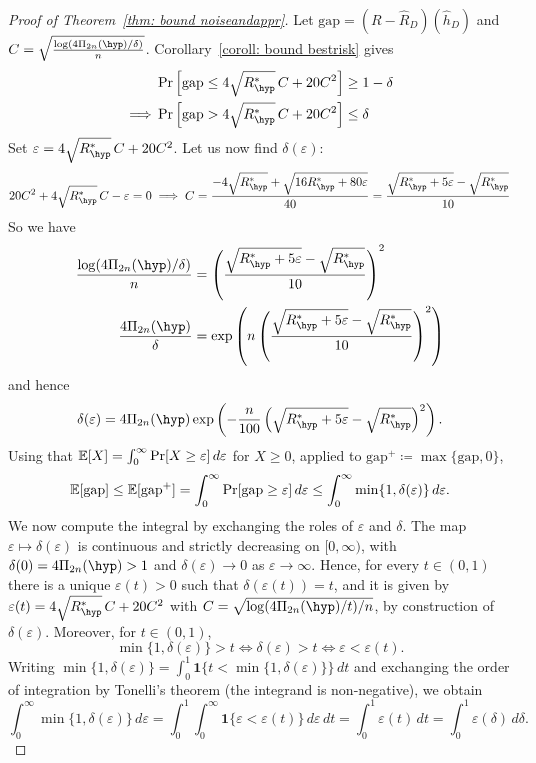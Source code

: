 \documentclass[reqno]{amsart}
\begin{document}
\begin{theorem}
\begin{proof}[Proof of Theorem~\ref{thm: bound noiseandappr}]
    Let $\text{gap} = (R-\hat R_D)(\hat h_D)$ and $C = \sqrt{\frac{\log(4 \Pi_{2n}(\hyp)/\delta)}{n}}$. Corollary~\ref{coroll: bound bestrisk} gives
\begin{align*}
&\Pr\left[\text{gap} \le 4\sqrt{R^*_\hyp}\,C + 20C^2\right] \ge 1-\delta \\
\implies &\Pr\left[\text{gap} > 4\sqrt{R^*_\hyp}\,C + 20C^2\right] \le \delta
\end{align*}
Set $\varepsilon = 4\sqrt{R^*_\hyp}\,C + 20C^2$. Let us now find $\delta(\varepsilon)$:
\[
20C^2 + 4\sqrt{R^*_\hyp}\,C - \varepsilon = 0 \implies C = \frac{-4\sqrt{R^*_\hyp} + \sqrt{16R^*_\hyp + 80\varepsilon}}{40} = \frac{\sqrt{R^*_\hyp + 5\varepsilon} - \sqrt{R^*_\hyp}}{10}
\]
So we have
\begin{align*}
\frac{\log(4\Pi_{2n}(\hyp)/\delta)}{n} &= \left(\frac{\sqrt{R^*_\hyp + 5\varepsilon} - \sqrt{R^*_\hyp}}{10}\right)^2 \\
\frac{4\Pi_{2n}(\hyp)}{\delta} &= \exp\left(n\left(\frac{\sqrt{R^*_\hyp + 5\varepsilon} - \sqrt{R^*_\hyp}}{10}\right)^2\right)
\end{align*}
and hence
\[
\delta(\varepsilon) = 4\Pi_{2n}(\hyp)\exp\left(-\frac{n}{100}\left(\sqrt{R^*_\hyp + 5\varepsilon} - \sqrt{R^*_\hyp}\right)^2\right).
\]
Using that $\mathbb{E}[X] = \int_0^\infty \Pr[X \ge \varepsilon]\,d\varepsilon$ for $X \ge 0$, applied to $\text{gap}^+ \coloneq \max\{\text{gap}, 0\}$,
\[
\mathbb{E}[\text{gap}] \le \mathbb{E}[\text{gap}^+] = \int_0^\infty \Pr[\text{gap} \ge \varepsilon]\,d\varepsilon \le \int_0^\infty \min\{1, \delta(\varepsilon)\}\,d\varepsilon.
\]
We now compute the integral by exchanging the roles of $\varepsilon$ and $\delta$. The map $\varepsilon\mapsto\delta(\varepsilon)$ is continuous and strictly decreasing on $[0,\infty)$, with $\delta(0) = 4\Pi_{2n}(\hyp) > 1$ and $\delta(\varepsilon)\to0$ as $\varepsilon\to\infty$. Hence, for every $t\in(0,1)$ there is a unique $\varepsilon(t)>0$ such that $\delta(\varepsilon(t)) = t$, and it is given by $\varepsilon(t) = 4\sqrt{R^*_\hyp}\,C + 20C^2$ with $C = \sqrt{\log(4\Pi_{2n}(\hyp)/t)/n}$, by construction of $\delta(\varepsilon)$. Moreover, for $t\in(0,1)$,
\[
\min\{1,\delta(\varepsilon)\} > t \iff \delta(\varepsilon) > t \iff \varepsilon < \varepsilon(t).
\]
Writing $\min\{1,\delta(\varepsilon)\} = \int_0^1 \mathbf 1\{t < \min\{1,\delta(\varepsilon)\}\}\,dt$ and exchanging the order of integration by Tonelli's theorem (the integrand is non-negative), we obtain
\[
\int_0^\infty \min\{1, \delta(\varepsilon)\}\,d\varepsilon = \int_0^1 \int_0^\infty \mathbf 1\{\varepsilon < \varepsilon(t)\}\,d\varepsilon\,dt = \int_0^1 \varepsilon(t)\,dt = \int_0^1 \varepsilon(\delta)\,d\delta.
\]
\end{proof}
\end{theorem}
\end{document}
